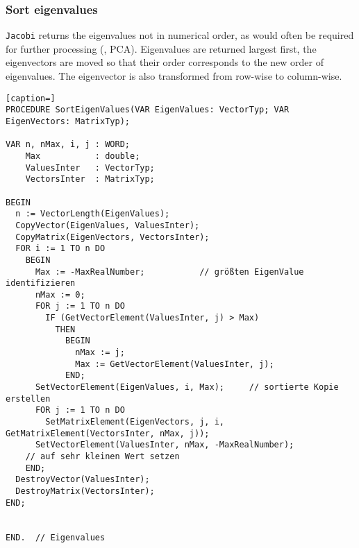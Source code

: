 \subsubsection{Sort eigenvalues}

\texttt{Jacobi} returns the eigenvalues not in numerical order, as would often be required for further processing (, \acs{PCA}).  Eigenvalues are returned largest first, the eigenvectors are moved so that their order corresponds to the new order of eigenvalues. The eigenvector is also transformed from row-wise to column-wise.

\begin{lstlisting}[caption=]
PROCEDURE SortEigenValues(VAR EigenValues: VectorTyp; VAR EigenVectors: MatrixTyp);

VAR n, nMax, i, j : WORD;
    Max           : double;
    ValuesInter   : VectorTyp;
    VectorsInter  : MatrixTyp;

BEGIN
  n := VectorLength(EigenValues);
  CopyVector(EigenValues, ValuesInter);
  CopyMatrix(EigenVectors, VectorsInter);
  FOR i := 1 TO n DO
    BEGIN
      Max := -MaxRealNumber;           // größten EigenValue identifizieren
      nMax := 0;
      FOR j := 1 TO n DO
        IF (GetVectorElement(ValuesInter, j) > Max)
          THEN
            BEGIN
              nMax := j;
              Max := GetVectorElement(ValuesInter, j);
            END;
      SetVectorElement(EigenValues, i, Max);     // sortierte Kopie erstellen
      FOR j := 1 TO n DO
        SetMatrixElement(EigenVectors, j, i, GetMatrixElement(VectorsInter, nMax, j));
      SetVectorElement(ValuesInter, nMax, -MaxRealNumber);
    // auf sehr kleinen Wert setzen
    END;
  DestroyVector(ValuesInter);
  DestroyMatrix(VectorsInter);
END;


END.  // Eigenvalues
\end{lstlisting}
